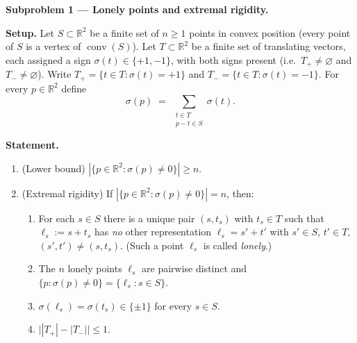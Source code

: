 \documentclass{article}
\begin{document}
\textbf{Subproblem 1 --- Lonely points and extremal rigidity.}

\medskip
\textbf{Setup.}
Let $S\subset\mathbb{R}^2$ be a finite set of $n\ge 1$ points in convex position
(every point of $S$ is a vertex of $\operatorname{conv}(S)$).
Let $T\subset\mathbb{R}^2$ be a finite set of translating vectors, each assigned a sign
$\sigma(t)\in\{+1,-1\}$, with both signs present (i.e.\ $T_+\neq\varnothing$ and $T_-\neq\varnothing$).
Write $T_+=\{t\in T:\sigma(t)=+1\}$ and $T_-=\{t\in T:\sigma(t)=-1\}$.
For every $p\in\mathbb{R}^2$ define
\[
  \sigma(p) \;=\; \sum_{\substack{t\in T \\ p-t\in S}} \sigma(t).
\]

\medskip
\textbf{Statement.}
\begin{enumerate}
  \item (Lower bound) $|\{p\in\mathbb{R}^2:\sigma(p)\neq 0\}|\ge n$.
  \item (Extremal rigidity) If $|\{p\in\mathbb{R}^2:\sigma(p)\neq 0\}|=n$, then:
    \begin{enumerate}
      \item For each $s\in S$ there is a unique pair $(s,t_s)$ with $t_s\in T$ such that
            $\ell_s:=s+t_s$ has \emph{no} other representation $\ell_s=s'+t'$ with $s'\in S$,
            $t'\in T$, $(s',t')\neq(s,t_s)$.  (Such a point $\ell_s$ is called \emph{lonely}.)
      \item The $n$ lonely points $\ell_s$ are pairwise distinct and
            $\{p:\sigma(p)\neq 0\}=\{\ell_s:s\in S\}$.
      \item $\sigma(\ell_s)=\sigma(t_s)\in\{\pm 1\}$ for every $s\in S$.
      \item $\bigl||T_+|-|T_-|\bigr|\le 1$.
    \end{enumerate}
\end{enumerate}
\end{document}
